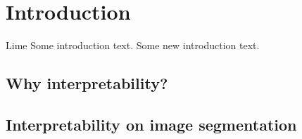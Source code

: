 \chapter{Introduction}
Lime \cite{ribeiro2016should}
Some introduction text.
Some new introduction text.

\section{Why interpretability?}

\section{Interpretability on image segmentation}
